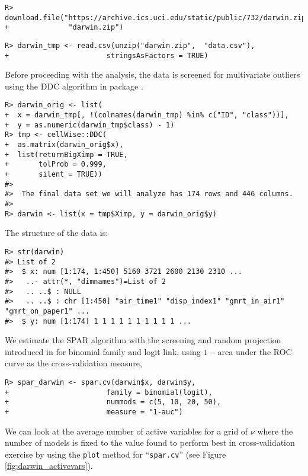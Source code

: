 \documentclass[
  article]{jss}
\begin{document}
\begin{verbatim}
R> download.file("https://archive.ics.uci.edu/static/public/732/darwin.zip",
+              "darwin.zip")
\end{verbatim}

\begin{verbatim}
R> darwin_tmp <- read.csv(unzip("darwin.zip",  "data.csv"), 
+                       stringsAsFactors = TRUE)
\end{verbatim}

Before proceeding with the analysis, the data is screened for
multivariate outliers using the DDC algorithm in package 
\citep{rcellwise}.

\begin{verbatim}
R> darwin_orig <- list(
+  x = darwin_tmp[, !(colnames(darwin_tmp) %in% c("ID", "class"))],
+  y = as.numeric(darwin_tmp$class) - 1)
R> tmp <- cellWise::DDC(
+  as.matrix(darwin_orig$x),
+  list(returnBigXimp = TRUE, 
+       tolProb = 0.999,
+       silent = TRUE))
#>  
#>  The final data set we will analyze has 174 rows and 446 columns.
#> 
R> darwin <- list(x = tmp$Ximp, y = darwin_orig$y)
\end{verbatim}

The structure of the data is:

\begin{verbatim}
R> str(darwin)
#> List of 2
#>  $ x: num [1:174, 1:450] 5160 3721 2600 2130 2310 ...
#>   ..- attr(*, "dimnames")=List of 2
#>   .. ..$ : NULL
#>   .. ..$ : chr [1:450] "air_time1" "disp_index1" "gmrt_in_air1" "gmrt_on_paper1" ...
#>  $ y: num [1:174] 1 1 1 1 1 1 1 1 1 1 ...
\end{verbatim}

We estimate the SPAR algorithm with the screening and random projection
introduced in \citet{parzer2024glms} for binomial family and logit link,
using \(1-\)area under the ROC curve as the cross-validation measure,

\begin{verbatim}
R> spar_darwin <- spar.cv(darwin$x, darwin$y,
+                       family = binomial(logit),
+                       nummods = c(5, 10, 20, 50),
+                       measure = "1-auc")
\end{verbatim}

We can look at the average number of active variables for a grid of
\(\nu\) where the number of models is fixed to the value found to
perform best in cross-validation exercise by using the \texttt{plot}
method for ``\texttt{spar.cv}'' (see Figure
\ref{fig:darwin_activevars}).
\end{document}
